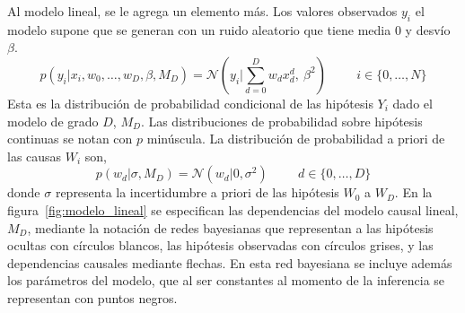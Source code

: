 \documentclass[a4paper,11pt]{book}
\newcommand{\N}{\mathcal{N}}
\theoremstyle{definition}
\begin{document}

Al modelo lineal, se le agrega un elemento m\'as.
%
Los valores observados $y_i$ el modelo supone que se generan con un ruido aleatorio que tiene media 0 y desv\'io $\beta$.
%
\begin{equation} \label{eq:likelihood_modelo_lineal}
p(y_i|x_i, w_0, \dots, w_D, \beta, M_D) = \N(y_i| \sum_{d = 0}^{D} w_d x_d^d,\ \beta^2) \hspace{1cm} \text{$i \in \{0,\dots, N\}$}
\end{equation}
%
Esta es la distribuci\'on de probabilidad condicional de las hip\'otesis $Y_i$ dado el modelo de grado $D$, $M_D$.
%
Las distribuciones de probabilidad sobre hip\'otesis continuas se notan con $p$ min\'uscula.
%
La distribuci\'on de probabilidad a priori de las causas $W_i$ son,
%
\begin{equation} \label{eq:prior_modelo_lineal}
p(w_d|\sigma,M_D) = \N(w_d|0, \sigma^2) \hspace{1cm} \text{$d \in \{0,\dots,D\}$}
\end{equation}
%
donde $\sigma$ representa la incertidumbre a priori de las hip\'otesis $W_0$ a $W_D$.
%
En la figura~\ref{fig:modelo_lineal} se especifican las dependencias del modelo causal lineal, $M_D$, mediante la notaci\'on de redes bayesianas que representan a las hip\'otesis ocultas con c\'irculos blancos, las hip\'otesis observadas con c\'irculos grises, y las dependencias causales mediante flechas.
%
En esta red bayesiana se incluye además los parámetros del modelo, que al ser constantes al momento de la inferencia se representan con puntos negros.
%
\end{document}
